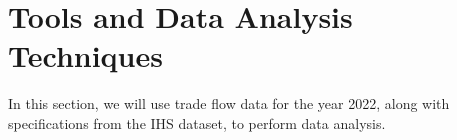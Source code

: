 \chapter{Tools and Data Analysis Techniques}

In this section, we will use trade flow data for the year 2022, along with specifications from the IHS dataset, to perform data analysis.




